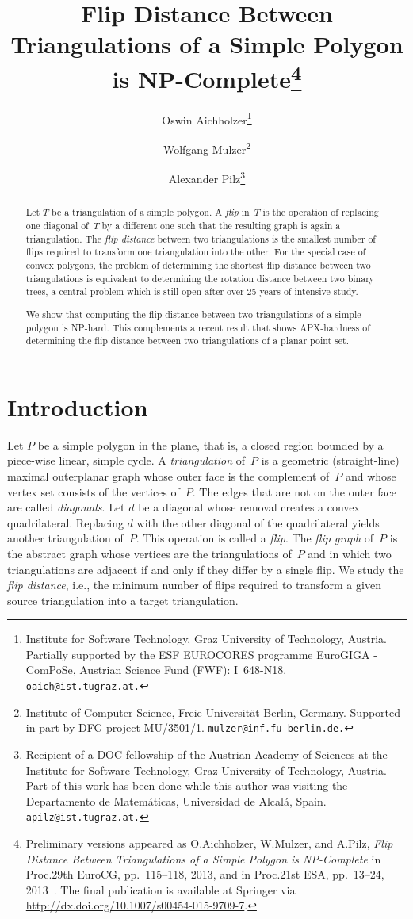 \documentclass[a4paper,11pt]{article}
\title{Flip Distance Between Triangulations of a Simple Polygon is NP-Complete\thanks{Preliminary versions appeared as O.\@ Aichholzer, W.\@ Mulzer, and
A.\@ Pilz, \emph{Flip Distance Between Triangulations of a Simple 
Polygon is NP-Complete} in Proc.\@ 29th EuroCG, pp.~115--118, 2013, and
in Proc.\@ 21st ESA, pp.~13--24, 
2013~\cite{eurocg_version,esa_version}.
The final publication is available at Springer via
\protect\url{http://dx.doi.org/10.1007/s00454-015-9709-7}.}
}
\author{Oswin Aichholzer\thanks{Institute for Software Technology, Graz 
University of Technology, Austria.
Partially supported by the ESF EUROCORES
programme EuroGIGA - ComPoSe, Austrian Science Fund (FWF): I~648-N18.
\texttt{oaich@ist.tugraz.at.}}
\and Wolfgang Mulzer\thanks{
Institute of Computer Science, Freie Universit\"at Berlin, Germany.
Supported in part by DFG project MU/3501/1.
\texttt{mulzer@inf.fu-berlin.de.}}
\and Alexander Pilz\thanks{Recipient of a DOC-fellowship of the Austrian
Academy of Sciences at the Institute for Software Technology, Graz University
of Technology, Austria.
Part of this work has been done while this author was visiting the 
Departamento de Matem\'aticas, Universidad de Alcal\'a, Spain.
\texttt{apilz@ist.tugraz.at.}}
}
\begin{document}
\maketitle

\begin{abstract}
Let $T$ be a triangulation of a simple polygon.
A \emph{flip} in~$T$ is the operation of replacing one diagonal of~$T$
by a different one such that the resulting graph is again
a triangulation.  The \emph{flip distance} between two triangulations is the smallest
number of flips required to transform one triangulation into the
other.
For the special case of convex polygons,
the problem of determining the shortest flip distance between two triangulations is equivalent to determining the rotation distance between two binary trees, 
a central problem which is still open after over 25 years of intensive study.

We show that computing the flip distance between two
triangulations of a simple polygon is NP-hard.  This complements a recent
result that shows APX-hardness of determining the flip distance between two
triangulations of a planar point set.
\end{abstract}

\section{Introduction}
Let $P$ be a simple polygon in the plane, that is, a closed region bounded by a 
piece-wise linear, simple cycle.  A \emph{triangulation} of~$P$ is a geometric 
(straight-line) maximal outerplanar graph whose outer face is the complement 
of~$P$ and whose vertex set consists of the vertices of~$P$.  The edges
that are not on the outer face are called \emph{diagonals}.  Let $d$ be a diagonal
whose removal creates a convex quadrilateral. Replacing $d$ with the
other diagonal of the quadrilateral yields another triangulation of~$P$.
This operation is called a \emph{flip}.
The \emph{flip graph} of~$P$ is the abstract graph whose vertices are the
triangulations of~$P$ and in which two triangulations are adjacent if and only if
they differ by a single
flip.  We 
study the \emph{flip distance}, i.e., the minimum number
of flips required to transform a given source triangulation into a target
triangulation.
\end{document}
